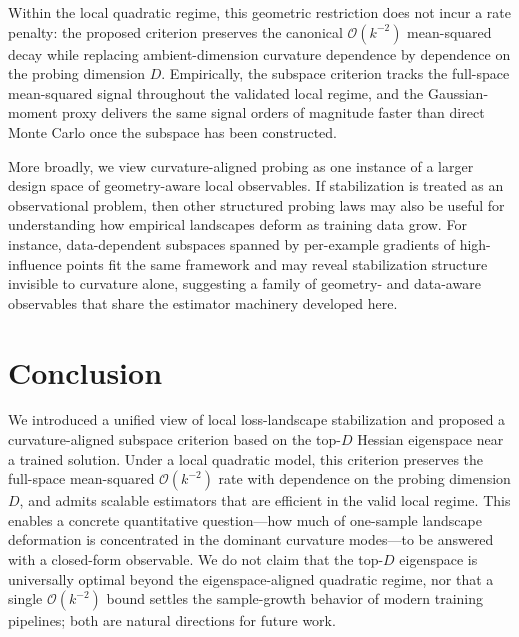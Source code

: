 \documentclass{article}
\begin{document}
Within the local quadratic regime, this geometric restriction does not incur a rate penalty: the proposed criterion preserves the canonical $\mathcal O(k^{-2})$ mean-squared decay while replacing ambient-dimension curvature dependence by dependence on the probing dimension $D$. Empirically, the subspace criterion tracks the full-space mean-squared signal throughout the validated local regime, and the Gaussian-moment proxy delivers the same signal orders of magnitude faster than direct Monte Carlo once the subspace has been constructed.

More broadly, we view curvature-aligned probing as one instance of a larger design space of geometry-aware local observables. If stabilization is treated as an observational problem, then other structured probing laws may also be useful for understanding how empirical landscapes deform as training data grow. For instance, data-dependent subspaces spanned by per-example gradients of high-influence points fit the same framework and may reveal stabilization structure invisible to curvature alone, suggesting a family of geometry- and data-aware observables that share the estimator machinery developed here.

\section{Conclusion}
\label{sec:conclusion}

We introduced a unified view of local loss-landscape stabilization and proposed a curvature-aligned subspace criterion based on the top-$D$ Hessian eigenspace near a trained solution. Under a local quadratic model, this criterion preserves the full-space mean-squared $\mathcal O(k^{-2})$ rate with dependence on the probing dimension $D$, and admits scalable estimators that are efficient in the valid local regime. This enables a concrete quantitative question---how much of one-sample landscape deformation is concentrated in the dominant curvature modes---to be answered with a closed-form observable. We do not claim that the top-$D$ eigenspace is universally optimal beyond the eigenspace-aligned quadratic regime, nor that a single $\mathcal O(k^{-2})$ bound settles the sample-growth behavior of modern training pipelines; both are natural directions for future work.








\end{document}
